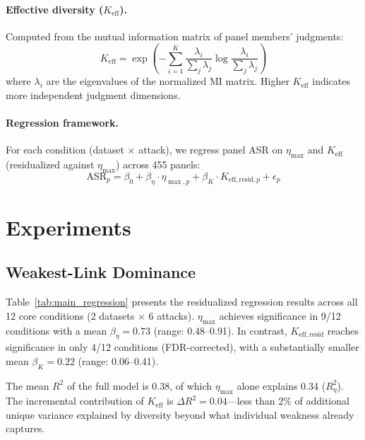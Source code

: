 \documentclass[11pt,a4paper]{article}
\begin{document}
\paragraph{Effective diversity ($K_{\mathrm{eff}}$).} Computed from the mutual information matrix of panel members' judgments:
\begin{equation}
K_{\mathrm{eff}} = \exp\left(-\sum_{i=1}^{K} \frac{\lambda_i}{\sum_j \lambda_j} \log \frac{\lambda_i}{\sum_j \lambda_j}\right)
\end{equation}
where $\lambda_i$ are the eigenvalues of the normalized MI matrix. Higher $K_{\mathrm{eff}}$ indicates more independent judgment dimensions.

\paragraph{Regression framework.} For each condition (dataset $\times$ attack), we regress panel ASR on $\eta_{\max}$ and $K_{\mathrm{eff}}$ (residualized against $\eta_{\max}$) across 455 panels:
\begin{equation}
\text{ASR}_p = \beta_0 + \beta_{\eta} \cdot \eta_{\max,p} + \beta_{K} \cdot K_{\mathrm{eff,resid},p} + \epsilon_p
\end{equation}

\section{Experiments}
\label{sec:experiments}

\subsection{Weakest-Link Dominance}
\label{sec:weakest_link}

Table~\ref{tab:main_regression} presents the residualized regression results across all 12 core conditions (2 datasets $\times$ 6 attacks).
$\eta_{\max}$ achieves significance in 9/12 conditions with a mean $\beta_{\eta} = 0.73$ (range: 0.48--0.91).
In contrast, $K_{\mathrm{eff,resid}}$ reaches significance in only 4/12 conditions (FDR-corrected), with a substantially smaller mean $\beta_K = 0.22$ (range: 0.06--0.41).

The mean $R^2$ of the full model is 0.38, of which $\eta_{\max}$ alone explains 0.34 ($R^2_{\eta}$).
The incremental contribution of $K_{\mathrm{eff}}$ is $\Delta R^2 = 0.04$---less than 2\% of additional unique variance explained by diversity beyond what individual weakness already captures.
\end{document}
